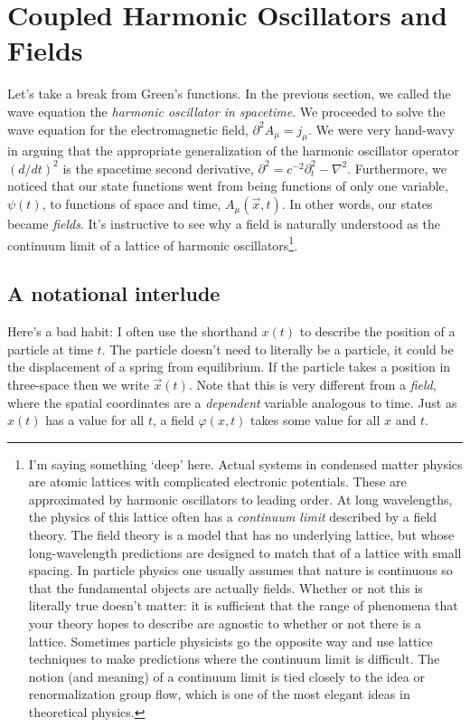 



\section{Coupled Harmonic Oscillators and Fields}
\label{sec:CHO:fields}

Let's take a break from Green's functions. In the previous section, we called the wave equation the \emph{harmonic oscillator in spacetime}. We proceeded to solve the wave equation for the electromagnetic field, $\partial^2 A_\mu = j_\mu$. We were very hand-wavy in arguing that the appropriate generalization of the harmonic oscillator operator $(d/dt)^2$ is the spacetime second derivative, $\partial^2 = c^{-2}\partial_t^2 - \nabla^2$. Furthermore, we noticed that our state functions went from being functions of only one variable, $\psi(t)$, to functions of space and time, $A_\mu(\vec{x},t)$. In other words, our states became \emph{fields}. It's instructive to see why a field is naturally understood as the continuum limit of a lattice of harmonic oscillators\footnote{I'm saying something `deep' here. Actual systems in condensed matter physics are atomic lattices with complicated electronic potentials. These are approximated by harmonic oscillators to leading order. At long wavelengths, the physics of this lattice often has a \emph{continuum limit} described by a field theory. The field theory is a model that has no underlying lattice, but whose long-wavelength predictions are designed to match that of a lattice with small spacing. In particle physics one usually assumes that nature is continuous so that the fundamental objects are actually fields. Whether or not this is literally true doesn't matter: it is sufficient that the range of phenomena that your theory hopes to describe are agnostic to whether or not there is a lattice. Sometimes particle physicists go the opposite way and use lattice techniques to make predictions where the continuum limit is difficult. The notion (and meaning) of a continuum limit is tied closely to the idea or renormalization group flow, which is one of the most elegant ideas in theoretical physics.}.


\subsection{A notational interlude}

Here's a bad habit: I often use the shorthand $x(t)$ to describe the position of a particle at time $t$. The particle doesn't need to literally be a particle, it could be the displacement of a spring from equilibrium. If the particle takes a position in three-space then we write $\vec{x}(t)$. Note that this is very different from a \emph{field}, where the spatial coordinates are a \emph{dependent} variable analogous to time. Just as $x(t)$ has a value for all $t$, a field $\varphi(x,t)$ takes some value for all $x$ and $t$. 

